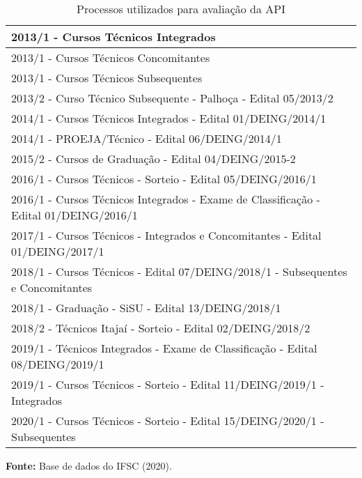 \begin{table}
\caption{Processos utilizados para avaliação da API}
\label{processos_utilizados}
\centering
\begin{tabular}{ |l| }
 \hline
2013/1 - Cursos Técnicos Integrados                                                        \\ \hline
2013/1 - Cursos Técnicos Concomitantes                                                     \\ \hline
2013/1 - Cursos Técnicos Subsequentes                                                      \\ \hline
2013/2 - Curso Técnico Subsequente - Palhoça - Edital 05/2013/2                            \\ \hline
2014/1 - Cursos Técnicos Integrados - Edital 01/DEING/2014/1                               \\ \hline
2014/1 - PROEJA/Técnico - Edital 06/DEING/2014/1                                           \\ \hline
2015/2 - Cursos de Graduação - Edital 04/DEING/2015-2                                      \\ \hline
2016/1 - Cursos Técnicos - Sorteio - Edital 05/DEING/2016/1                                \\ \hline
2016/1 - Cursos Técnicos Integrados - Exame de Classificação - Edital 01/DEING/2016/1      \\ \hline
2017/1 - Cursos Técnicos - Integrados e Concomitantes - Edital 01/DEING/2017/1             \\ \hline
2018/1 - Cursos Técnicos - Edital 07/DEING/2018/1 - Subsequentes e Concomitantes \\ \hline
2018/1 - Graduação - SiSU - Edital 13/DEING/2018/1                                         \\ \hline
2018/2 - Técnicos Itajaí - Sorteio - Edital 02/DEING/2018/2                                \\ \hline
2019/1 - Técnicos Integrados - Exame de Classificação - Edital 08/DEING/2019/1             \\ \hline
2019/1 - Cursos Técnicos - Sorteio - Edital 11/DEING/2019/1 - Integrados                   \\ \hline
2020/1 - Cursos Técnicos - Sorteio - Edital 15/DEING/2020/1 - Subsequentes                 \\ \hline
 \end{tabular} 
  \par\medskip\textbf{Fonte:} Base de dados do IFSC (2020). \par\medskip
\end{table}
